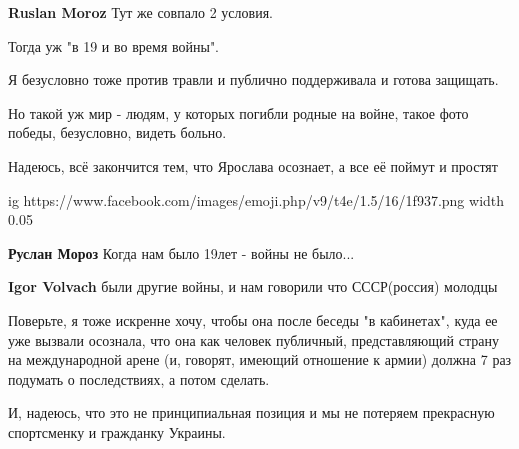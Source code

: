 \begin{itemize}
\begin{itemize}
\textbf{Ruslan Moroz}
Тут же совпало 2 условия.

Тогда уж "в 19 и во время войны".

Я безусловно тоже против травли и публично поддерживала и готова защищать.

Но такой уж мир - людям, у которых погибли родные на войне, такое фото победы,
безусловно, видеть больно.

Надеюсь, всё закончится тем, что Ярослава осознает, а все её поймут и простят

\ifcmt
  ig https://www.facebook.com/images/emoji.php/v9/t4e/1.5/16/1f937.png
  width 0.05
\fi


 
\textbf{Руслан Мороз}
Когда нам было 19лет - войны не было...

 
\textbf{Igor Volvach} были другие войны, и нам говорили что СССР(россия) молодцы

 

Поверьте, я тоже искренне хочу, чтобы она после беседы "в кабинетах", куда ее
уже вызвали осознала, что она как человек публичный, представляющий страну на
международной арене (и, говорят, имеющий отношение к армии) должна 7 раз
подумать о последствиях, а потом сделать.

И, надеюсь, что это не принципиальная позиция и мы не потеряем прекрасную
спортсменку и гражданку Украины.

\end{itemize}

 

\end{itemize}
